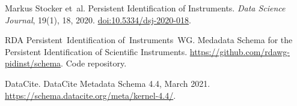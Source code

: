 \documentclass[titlepage=true,twoside=false,DIV=13]{scrartcl}
\begin{document}
%
%
\begin{thebibliography}{1}

Markus Stocker et~al.
\newblock Persistent Identification of Instruments.
\newblock \emph{Data Science Journal}, 19(1), 18, 2020.
\newblock \href{https://doi.org/10.5334/dsj-2020-018}{doi:10.5334/dsj-2020-018}.

RDA Persistent~Identification of~Instruments~WG.
\newblock Medadata Schema for the Persistent Identification of Scientific
  Instruments.
\newblock \url{https://github.com/rdawg-pidinst/schema}.
\newblock Code repository.

DataCite.
\newblock DataCite Metadata Schema 4.4, March 2021.
\newblock \url{https://schema.datacite.org/meta/kernel-4.4/}.

\end{thebibliography}
\end{document}
